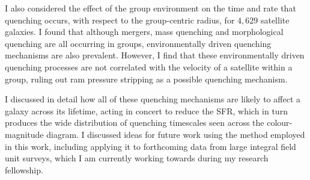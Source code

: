 \documentclass[12pt]{article}
\begin{document}
I also considered the effect of the group environment on the time and rate that quenching occurs, with respect to the group-centric radius, for $4,629$ satellite galaxies. I found that although mergers, mass quenching and morphological quenching are all occurring in groups, environmentally driven quenching mechanisms are also prevalent. However, I find that these environmentally driven quenching processes are not correlated with the velocity of a satellite within a group, ruling out ram pressure stripping as a possible quenching mechanism. 

I discussed in detail how all of these quenching mechanisms are likely to affect a galaxy across its lifetime, acting in concert to reduce the SFR, which in turn produces the wide distribution of quenching timescales seen across the colour-magnitude diagram. I discussed ideas for future work using the method employed in this work, including applying it to forthcoming data from large integral field unit surveys, which I am currently working towards during my research fellowship. 
\end{document}
